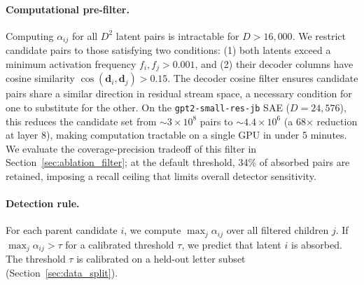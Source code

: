 \documentclass{article}
\begin{document}
\paragraph{Computational pre-filter.} Computing $\alpha_{ij}$ for all $D^2$ latent pairs is intractable for $D > 16{,}000$. We restrict candidate pairs to those satisfying two conditions: (1) both latents exceed a minimum activation frequency $f_i, f_j > 0.001$, and (2) their decoder columns have cosine similarity $\cos(\mathbf{d}_i, \mathbf{d}_j) > 0.15$. The decoder cosine filter ensures candidate pairs share a similar direction in residual stream space, a necessary condition for one to substitute for the other. On the \texttt{gpt2-small-res-jb} SAE ($D = 24{,}576$), this reduces the candidate set from ${\sim}3 \times 10^8$ pairs to ${\sim}4.4 \times 10^6$ (a 68$\times$ reduction at layer 8), making computation tractable on a single GPU in under 5 minutes. We evaluate the coverage-precision tradeoff of this filter in Section~\ref{sec:ablation_filter}; at the default threshold, 34\% of absorbed pairs are retained, imposing a recall ceiling that limits overall detector sensitivity.

\paragraph{Detection rule.} For each parent candidate $i$, we compute $\max_j \alpha_{ij}$ over all filtered children $j$. If $\max_j \alpha_{ij} > \tau$ for a calibrated threshold $\tau$, we predict that latent $i$ is absorbed. The threshold $\tau$ is calibrated on a held-out letter subset (Section~\ref{sec:data_split}).
\end{document}
